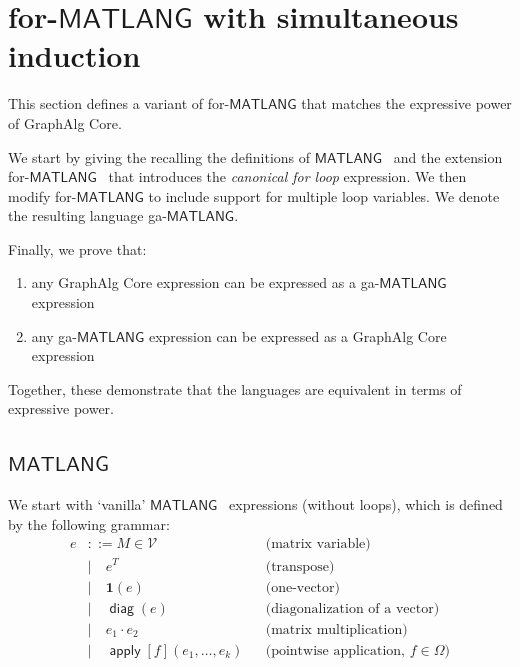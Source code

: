 \documentclass{article}
\newcommand\graphalg{\textsf{GraphAlg}}
\newcommand{\ML}{\mathsf{MATLANG}}
\newcommand{\transp}[1]{#1^T}
\newcommand{\SyntaxStyle}{\mathsf}
\newcommand{\LetIn}[3]{\SyntaxStyle{let}\ #1=#2\ \SyntaxStyle{in}\ #3}
\newcommand{\rowdom}{\mathbf{1}}
\DeclareMathOperator{\diag}{\mathsf{diag}}
\DeclareMathOperator{\Apply}{\mathsf{apply}}
\newcommand{\M}{M}
\newcommand{\Mvar}{\mathcal{V}}
\begin{document}
\section{for-$\ML$ with simultaneous induction}
This section defines a variant of for-$\ML$ that matches the expressive power of \graphalg{} Core.

We start by giving the recalling the definitions of $\ML$~\cite{brijder_expressive_2019} and the extension for-$\ML$~\cite{geerts_expressive_2021} that introduces the \emph{canonical for loop} expression.
We then modify for-$\ML$ to include support for multiple loop variables.
We denote the resulting language ga-$\ML$.

Finally, we prove that:
\begin{enumerate}
    \item any \graphalg{} Core expression can be expressed as a ga-$\ML$ expression
    \item any ga-$\ML$ expression can be expressed as a \graphalg{} Core expression
\end{enumerate}

Together, these demonstrate that the languages are equivalent in terms of expressive power.

\subsection{$\ML$}
We start with `vanilla' $\ML$~\cite{brijder_expressive_2019} expressions (without loops), which is defined by the following grammar:
\begin{align*}
    e & ::= \M \in \Mvar                      &  & \text{(matrix variable)}             \\
      & \mid\quad \transp{e}                  &  & \text{(transpose)}                   \\
      & \mid\quad \rowdom(e)                  &  & \text{(one-vector)}                  \\
      & \mid\quad \diag(e)                    &  & \text{(diagonalization of a vector)} \\
      & \mid\quad e_1 \cdot e_2               &  & \text{(matrix multiplication)}       \\
      & \mid\quad \Apply[f](e_1, \ldots, e_k) &  & \text{(pointwise
        application, $f \in \Omega$)}
\end{align*}
\end{document}
